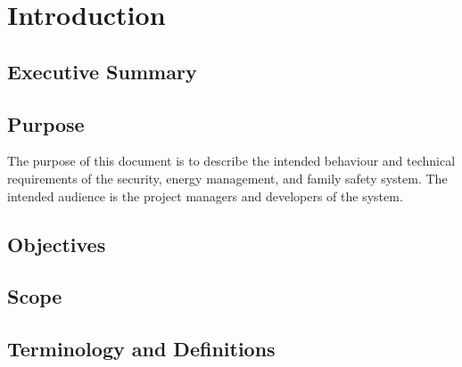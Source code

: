 \documentclass{report}
\begin{document}

\tableofcontents
\listoffigures

\chapter{Introduction}
\section{Executive Summary}

\section{Purpose}
The purpose of this document is to describe the intended behaviour and
technical requirements of the security, energy management, and family safety
system.
The intended audience is the project managers and developers of the system.

\section{Objectives}


\section{Scope}

\section{Terminology and Definitions}

\end{document}
